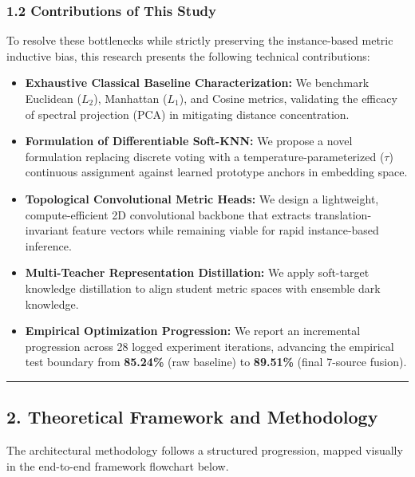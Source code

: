 \subsubsection{1.2 Contributions of This
Study}\label{12-contributions-of-this-study}

To resolve these bottlenecks while strictly preserving the
instance-based metric inductive bias, this research presents the
following technical contributions:

\begin{itemize}
\tightlist
\item
  \textbf{Exhaustive Classical Baseline Characterization:} We benchmark
  Euclidean (\(L_2\)), Manhattan (\(L_1\)), and Cosine metrics,
  validating the efficacy of spectral projection (PCA) in mitigating
  distance concentration.
\item
  \textbf{Formulation of Differentiable Soft-KNN:} We propose a novel
  formulation replacing discrete voting with a temperature-parameterized
  (\(\tau\)) continuous assignment against learned prototype anchors in
  embedding space.
\item
  \textbf{Topological Convolutional Metric Heads:} We design a
  lightweight, compute-efficient 2D convolutional backbone that extracts
  translation-invariant feature vectors while remaining viable for rapid
  instance-based inference.
\item
  \textbf{Multi-Teacher Representation Distillation:} We apply
  soft-target knowledge distillation to align student metric spaces with
  ensemble dark knowledge.
\item
  \textbf{Empirical Optimization Progression:} We report an incremental
  progression across 28 logged experiment iterations, advancing the
  empirical test boundary from \textbf{85.24\%} (raw baseline) to
  \textbf{89.51\%} (final 7-source fusion).
\end{itemize}

\begin{center}\rule{0.5\linewidth}{0.5pt}\end{center}

\subsection{2. Theoretical Framework and
Methodology}\label{2-theoretical-framework-and-methodology}

The architectural methodology follows a structured progression, mapped
visually in the end-to-end framework flowchart below.

